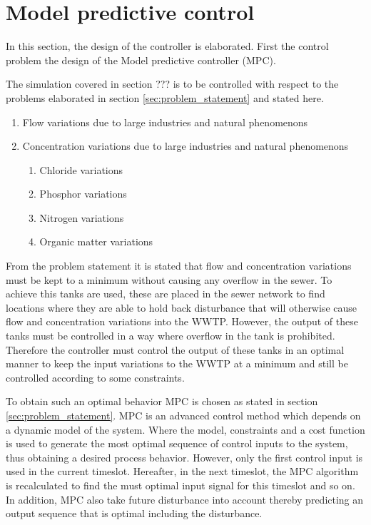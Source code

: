 \section{Model predictive control}\label{se:model_predictive_control}
In this section, the design of the controller is elaborated. First the control problem the design of the Model predictive controller (MPC). 

The simulation covered in section ??? is to be controlled with respect to the problems elaborated in section \ref{sec:problem_statement} and stated here. 
\begin{enumerate}
\item Flow variations due to large industries and natural phenomenons
\item Concentration variations due to large industries and natural phenomenons
\begin{enumerate}
	\item Chloride variations
	\item Phosphor variations
	\item Nitrogen variations
	\item Organic matter variations
\end{enumerate}
\end{enumerate}

From the problem statement it is stated that flow and concentration variations must be kept to a minimum without causing any overflow in the sewer. To achieve this tanks are used, these are placed in the sewer network to find locations where they are able to hold back disturbance that will otherwise cause flow and concentration variations into the WWTP. However, the output of these tanks must be controlled in a way where overflow in the tank is prohibited. Therefore the controller must control the output of these tanks in an optimal manner to keep the input variations to the WWTP at a minimum and still be controlled according to some constraints.

To obtain such an optimal behavior MPC is chosen as stated in section \ref{sec:problem_statement}. MPC is an advanced control method which depends on a dynamic model of the system. Where the model, constraints and a cost function is used to generate the most optimal sequence of control inputs to the system, thus obtaining a desired process behavior. However, only the first control input is used in the current timeslot. Hereafter, in the next timeslot, the MPC algorithm is recalculated to find the must optimal input signal for this timeslot and so on. In addition, MPC also take future disturbance into account thereby predicting an output sequence that is optimal including the disturbance.  %

